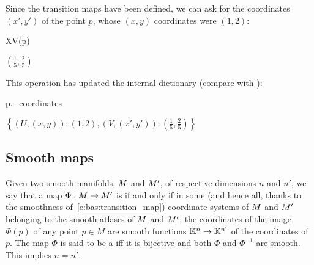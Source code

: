 Since the transition maps have been defined,
we can ask for the coordinates $(x',y')$ of the point $p$, whose $(x,y)$
coordinates were $(1,2)$:
\begin{NBin}
XV(p)
\end{NBin}
\begin{NBout}
$\displaystyle
\left( \frac{1}{5}, \frac{2}{5} \right)$
\end{NBout}
This operation has updated the internal dictionary 
(compare with ):
\begin{NBin}
p._coordinates
\end{NBin}
\begin{NBout}
$\displaystyle \left\{ (U, (x,y)) : (1,2), \left( V, (x', y') \right) : \left( \frac{1}{5}, \frac{2}{5} \right) \right\}$
\end{NBout}

\subsection{Smooth maps}

Given two smooth manifolds, $M$ and $M'$, of
respective dimensions $n$ and $n'$, we say that a map
$\Phi : M \rightarrow M'$ is  if and only if in some (and hence all, thanks to the smoothness of~\eqref{e:bas:transition_map}) coordinate systems
of $M$ and $M'$ belonging to the smooth atlases of $M$ and $M'$,
the coordinates of the image $\Phi(p)$ of any point $p\in M$
are smooth functions $\mathbb{K}^n\rightarrow \mathbb{K}^{n'}$ of the coordinates of $p$.
The map $\Phi$ is said to be a  iff
it is bijective and both $\Phi$ and $\Phi^{-1}$ are smooth. This implies $n=n'$.

